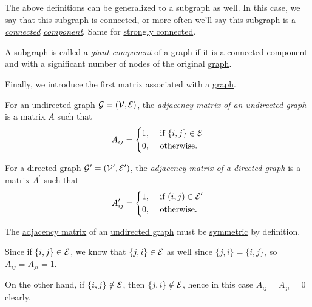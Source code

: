 \begin{notation}
	The above definitions can be generalized to a \hyperref[def:subgraph]{subgraph} as well. In this case, we say that this \hyperref[def:subgraph]{subgraph} is
	\hyperref[def:connected]{connected}, or more often we'll say this \hyperref[def:subgraph]{subgraph} is a \emph{\hyperref[def:connected]{connected} \hyperref[def:subgraph]{component}}.
	Same for \hyperref[def:strongly-connected]{strongly connected}.
\end{notation}

\begin{definition}\label{def:giant-component}
	A \hyperref[def:subgraph]{subgraph} is called a \emph{giant component} of a \hyperref[def:graph]{graph} if it is a \hyperref[def:connected]{connected} component and with a
	significant number of nodes of the original \hyperref[def:graph]{graph}.
\end{definition}

Finally, we introduce the first matrix associated with a \hyperref[def:graph]{graph}.
\begin{definition}\label{def:adjacency-matrix}
	For an \hyperref[def:undirected-graph]{undirected graph} \(\mathcal{\MakeUppercase{g}} = (\mathcal{\MakeUppercase{v}} , \mathcal{\MakeUppercase{e}} )\),
	the \emph{adjacency matrix of an \hyperref[def:undirected-graph]{undirected graph}} is a matrix \(A\) such that
	\[
		A_{ij} =\begin{dcases}
			1, & \text{ if }\{i, j\}\in\mathcal{E} \\
			0, & \text{ otherwise.}
		\end{dcases}
	\]

	For a \hyperref[def:directed-graph]{directed graph} \(\mathcal{\MakeUppercase{g}}^\prime = (\mathcal{\MakeUppercase{v}}^\prime , \mathcal{\MakeUppercase{e}}^\prime )\),
	the \emph{adjacency matrix of a \hyperref[def:directed-graph]{directed graph}} is a matrix \(A^\prime\) such that
	\[
		A^\prime _{ij} = \begin{dcases}
			1, & \text{ if }(i, j)\in\mathcal{E}^\prime \\
			0, & \text{ otherwise.}
		\end{dcases}
	\]
\end{definition}

\begin{remark}
	The \hyperref[def:adjacency-matrix]{adjacency matrix} of an \hyperref[def:undirected-graph]{undirected graph} must be \hyperref[def:symmetric-matrix]{symmetric} by definition.
\end{remark}
\begin{explanation}
	Since if \(\{i, j\}\in \mathcal{\MakeUppercase{e}} \), we know that \(\{j, i\}\in \mathcal{\MakeUppercase{e}} \) as well since \(\{j, i\} = \{i, j\}\), so
	\(A_{ij} = A_{ji} = 1\).

	On the other hand, if \(\{i, j\}\notin \mathcal{\MakeUppercase{e}} \), then \(\{j, i\}\notin \mathcal{\MakeUppercase{e}} \), hence in this case
	\(A_{ij} = A_{ji} = 0\) clearly.
\end{explanation}